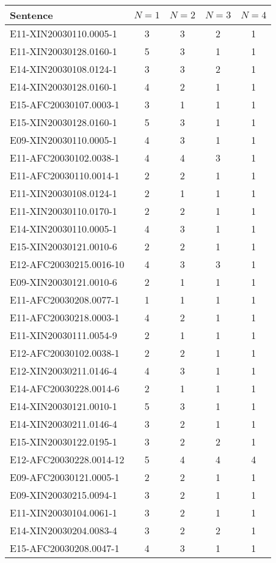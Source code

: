 \documentclass{article}
\begin{document}
\begin{tabular}{|l|c|c|c|c|}
\hline
Sentence               & $N=1$ & $N=2$ & $N=3$ & $N=4$ \\
\hline \hline
E11-XIN20030110.0005-1 & 3 & 3 & 2 & 1 \\ \hline
E11-XIN20030128.0160-1 & 5 & 3 & 1 & 1 \\ \hline
E14-XIN20030108.0124-1 & 3 & 3 & 2 & 1 \\ \hline
E14-XIN20030128.0160-1 & 4 & 2 & 1 & 1 \\ \hline
E15-AFC20030107.0003-1 & 3 & 1 & 1 & 1 \\ \hline
E15-XIN20030128.0160-1 & 5 & 3 & 1 & 1 \\ \hline
E09-XIN20030110.0005-1 & 4 & 3 & 1 & 1 \\ \hline
E11-AFC20030102.0038-1 & 4 & 4 & 3 & 1 \\ \hline
E11-AFC20030110.0014-1 & 2 & 2 & 1 & 1 \\ \hline
E11-XIN20030108.0124-1 & 2 & 1 & 1 & 1 \\ \hline
E11-XIN20030110.0170-1 & 2 & 2 & 1 & 1 \\ \hline
E14-XIN20030110.0005-1 & 4 & 3 & 1 & 1 \\ \hline
E15-XIN20030121.0010-6 & 2 & 2 & 1 & 1 \\ \hline
E12-AFC20030215.0016-10 & 4 & 3 & 3 & 1 \\ \hline
E09-XIN20030121.0010-6 & 2 & 1 & 1 & 1 \\ \hline
E11-AFC20030208.0077-1 & 1 & 1 & 1 & 1 \\ \hline
E11-AFC20030218.0003-1 & 4 & 2 & 1 & 1 \\ \hline
E11-XIN20030111.0054-9 & 2 & 1 & 1 & 1 \\ \hline
E12-AFC20030102.0038-1 & 2 & 2 & 1 & 1 \\ \hline
E12-XIN20030211.0146-4 & 4 & 3 & 1 & 1 \\ \hline
E14-AFC20030228.0014-6 & 2 & 1 & 1 & 1 \\ \hline
E14-XIN20030121.0010-1 & 5 & 3 & 1 & 1 \\ \hline
E14-XIN20030211.0146-4 & 3 & 2 & 1 & 1 \\ \hline
E15-XIN20030122.0195-1 & 3 & 2 & 2 & 1 \\ \hline
E12-AFC20030228.0014-12 & 5 & 4 & 4 & 4 \\ \hline
E09-AFC20030121.0005-1 & 2 & 2 & 1 & 1 \\ \hline
E09-XIN20030215.0094-1 & 3 & 2 & 1 & 1 \\ \hline
E11-XIN20030104.0061-1 & 3 & 2 & 1 & 1 \\ \hline
E14-XIN20030204.0083-4 & 3 & 2 & 2 & 1 \\ \hline
E15-AFC20030208.0047-1 & 4 & 3 & 1 & 1 \\
\hline
\end{tabular}
\end{document}
